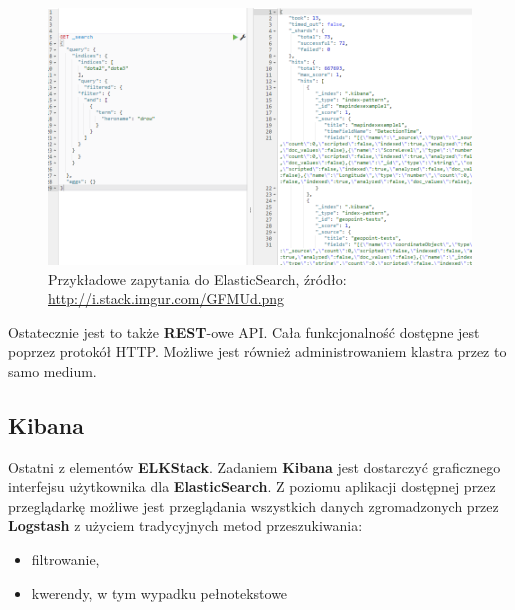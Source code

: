    \begin{figure}[h]
        \centering
        \includegraphics[width=1.0\textwidth]{images/es_query}
        \caption[Przykładowe zapytania do ElasticSearch]{
            Przykładowe zapytania do ElasticSearch, źródło: \url{http://i.stack.imgur.com/GFMUd.png}
        }
        \label{chapter:application:elkstack:es:query}
    \end{figure}

    Ostatecznie jest to także \textbf{REST}-owe API. Cała funkcjonalność dostępne jest poprzez
    protokół HTTP. Możliwe jest również administrowaniem klastra przez to samo medium.

\clearpage

\subsection{Kibana}
\label{chapter:application:elkstack:kibana}

    Ostatni z elementów \textbf{ELKStack}. Zadaniem \textbf{Kibana} jest dostarczyć graficznego interfejsu
    użytkownika dla \textbf{ElasticSearch}. Z poziomu aplikacji dostępnej przez przeglądarkę możliwe
    jest przeglądania wszystkich danych zgromadzonych przez \textbf{Logstash} z użyciem tradycyjnych
    metod przeszukiwania:
    \begin{itemize}
        \item filtrowanie,
        \item kwerendy, w tym wypadku pełnotekstowe
    \end{itemize}
    
